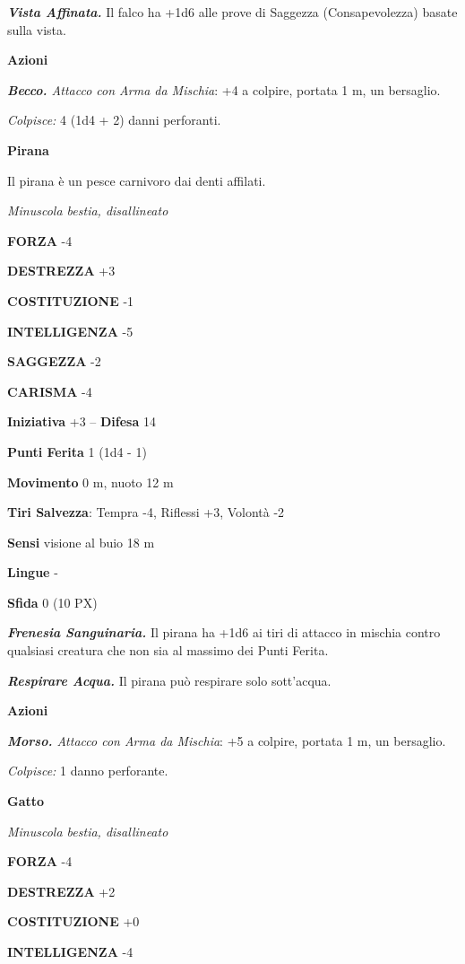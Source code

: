 \begin{multicols}{2}
	\textit{\textbf{Vista Affinata.}} Il falco ha +1d6 alle prove di Saggezza (Consapevolezza) basate sulla vista.

	\textbf{Azioni}

	\textit{\textbf{Becco.} Attacco con Arma da Mischia}: +4 a colpire, portata 1 m, un bersaglio.

	\textit{Colpisce:} 4 (1d4 + 2) danni perforanti.

	\medskip\textbf{Pirana}

	Il pirana è un pesce carnivoro dai denti affilati.

	\textit{Minuscola bestia, disallineato}

	\textbf{FORZA} -4

	\textbf{DESTREZZA} +3

	\textbf{COSTITUZIONE} -1

	\textbf{INTELLIGENZA} -5

	\textbf{SAGGEZZA} -2

	\textbf{CARISMA} -4

	\textbf{Iniziativa} +3 -- \textbf{Difesa} 14

	\textbf{Punti Ferita} 1 (1d4 - 1)

	\textbf{Movimento} 0 m, nuoto 12 m

	\textbf{Tiri Salvezza}: Tempra -4, Riflessi +3, Volontà -2

	\textbf{Sensi} visione al buio 18 m

	\textbf{Lingue} -

	\textbf{Sfida} 0 (10 PX)

	\textit{\textbf{Frenesia Sanguinaria.}} Il pirana ha +1d6 ai tiri di attacco in mischia contro qualsiasi creatura che non sia al massimo dei Punti Ferita.

	\textit{\textbf{Respirare Acqua.}} Il pirana può respirare solo sott'acqua.

	\textbf{Azioni}

	\textit{\textbf{Morso.} Attacco con Arma da Mischia}: +5 a colpire, portata 1 m, un bersaglio.

	\textit{Colpisce:} 1 danno perforante.

	\medskip\textbf{Gatto}

	\textit{Minuscola bestia, disallineato}

	\textbf{FORZA} -4

	\textbf{DESTREZZA} +2

	\textbf{COSTITUZIONE} +0

	\textbf{INTELLIGENZA} -4


\end{multicols}
